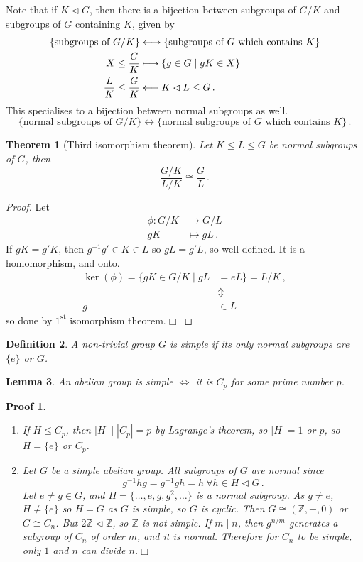 \documentclass{article}
\theoremstyle{plain}\theoremheaderfont{\normalfont\itshape}\theorembodyfont{\rmfamily}\theoremseparator{.}\newtheorem*{rem}{Remark}\newtheorem*{ex}{Example}\newtheorem*{proof}{Proof}\newtheorem*{altp}{Alternative proof}\newtheorem*{nonex}{Non-Example}
\theoremstyle{plain}\theoremheaderfont{\normalfont\bfseries}\theorembodyfont{\rmfamily}\theoremseparator{.}\newtheorem{thm}{Theorem}[section]\newtheorem{lem}[thm]{Lemma}\newtheorem{prop}[thm]{Proposition}\newtheorem*{cor}{Corollary}\newtheorem{defn}[thm]{Definition}\newtheorem{clm}[thm]{Claim}\newtheorem{clminproof}{Claim}\newtheorem*{notn}{Notation}\newtheorem*{exer}{Exercise}\newtheorem*{lemnn}{Lemma}
\theoremstyle{break}\theoremheaderfont{\normalfont\itshape}\theorembodyfont{\rmfamily}\theoremseparator{.\medskip}\newtheorem*{proofskip}{Proof}\newtheorem*{exs}{Examples}\newtheorem*{rems}{Remarks}\newtheorem*{obs}{Observations}
\theoremstyle{break}\theoremheaderfont{\normalfont\bfseries}\theorembodyfont{\rmfamily}\theoremseparator{.\medskip}\newtheorem{lemskip}[thm]{Lemma}\newtheorem{defnskip}[thm]{Definition}\newtheorem{propskip}[thm]{Proposition}\newtheorem{thmskip}[thm]{Theorem}
\numberwithin{equation}{section}
\newcommand{\qed}{\hfill\ensuremath{\Box}}
\newcommand{\abs}[1]{\left|#1\right|}
\newcommand{\ZZ}{\mathbb{Z}}
\newcommand{\longmappedfrom}{\;\reflectbox{\(\longmapsto\)}\;}
\begin{document}
    Note that if \(K\lhd G\), then there is a bijection between subgroups of \(G/K\) and subgroups of \(G\) containing \(K\), given by
    \begin{align*}
        \{\text{subgroups of }G/K\}&\longleftrightarrow\{\text{subgroups of }G\text{ which contains }K\}\\
        X\le\frac{G}{K}&\longmapsto\{g\in G\mid gK\in X\}\\
        \frac{L}{K}\le\frac{G}{K}&\longmappedfrom K\lhd L\le G\,.
    \end{align*}
    This specialises to a bijection between normal subgroups as well.
    \[\{\text{normal subgroups of }G/K\}\longleftrightarrow\{\text{normal subgroups of }G\text{ which contains }K\}\,.\]
    \begin{thm}[Third isomorphism theorem]
        Let \(K\le L\le G\) be normal subgroups of \(G\), then
        \[\frac{G/K}{L/K}\cong\frac{G}{L}\,.\]
    \end{thm}
    \begin{proof}
        Let
        \begin{align*}
            \phi:G/K&\longrightarrow G/L\\
            gK&\longmapsto gL\,.
        \end{align*}
        If \(gK=g'K\), then \(g^{-1}g'\in K\in L\) so \(gL=g'L\), so well-defined. It is a homomorphism, and onto.
        \begin{align*}
            \ker(\phi)=\{gK\in G/K\mid gL&=eL\}=L/K\,,\\
            &\Updownarrow\\
            g&\in L
        \end{align*}
        so done by \(1^{\text{st}}\) isomorphism theorem.\qed
    \end{proof}
    \begin{defn}
        A non-trivial group \(G\) is \textit{simple} if its only normal subgroups are \(\{e\}\) or \(G\).
    \end{defn}
    \begin{lem}
        An abelian group is simple \(\iff\) it is \(C_p\) for some prime number \(p\).
    \end{lem}
    \begin{proofskip}
        \begin{enumerate}[topsep=0pt]
            \item[(\(\Leftarrow\))] If \(H\le C_p\), then \(\abs{H}\mid\abs{C_p}=p\) by Lagrange's theorem, so \(\abs{H}=1\) or \(p\), so \(H=\{e\}\) or \(C_p\).
            \item[(\(\Rightarrow\))] Let \(G\) be a simple abelian group. All subgroups of \(G\) are normal since
            \[g^{-1}hg=g^{-1}gh=h\ \forall h\in H\lhd G\,.\]
            Let \(e\ne g\in G\), and \(H=\{\dots,e,g,g^2,\dots\}\) is a normal subgroup. As \(g\ne e\), \(H\ne\{e\}\) so \(H=G\) as \(G\) is simple, so \(G\) is cyclic. Then \(G\cong (\ZZ,+,0)\) or \(G\cong C_n\). But \(2\ZZ\lhd\ZZ\), so \(\ZZ\) is not simple. If \(m\mid n\), then \(g^{n/m}\) generates a subgroup of \(C_n\) of order \(m\), and it is normal. Therefore for \(C_n\) to be simple, only \(1\) and \(n\) can divide \(n\).\qed
        \end{enumerate}
    \end{proofskip}
\end{document}
